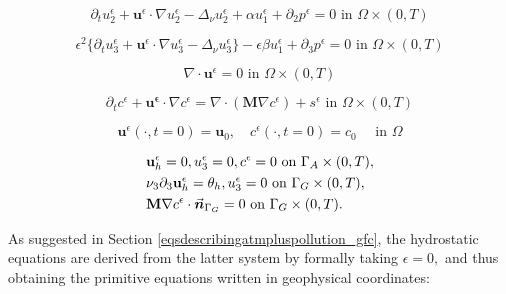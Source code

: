 \documentclass[12pt]{report}
\numberwithin{theorem}{chapter}
\numberwithin{corollary}{chapter}
\numberwithin{lemma}{chapter}
\numberwithin{remark}{chapter}
\numberwithin{definition}{chapter}
\numberwithin{prop}{chapter}
\begin{document}
\begin{equation} \label{ANSC2_coordinates_GFC}
  \partial_t u_2^\epsilon + \mathbf{u}^\epsilon \cdot \nabla u_2^\epsilon -\Delta_\nu u_2^\epsilon + \alpha u_1^\epsilon + \partial_2 p^\epsilon = 0 \text{ in } \Omega \times (0,T)
\end{equation}

\begin{equation} \label{ANSC3_coordinates_GFC}
  \epsilon^2 \{  \partial_t u_3^\epsilon + \mathbf{u}^\epsilon \cdot \nabla u_3^\epsilon -\Delta_\nu u_3^{\epsilon} \} - \epsilon \beta u_1^\epsilon + \partial_3 p^\epsilon = 0 \text{ in } \Omega \times (0,T)
\end{equation}

\begin{equation} \label{ANSC4_coordinates_GFC}
  \nabla \cdot \mathbf{u}^\epsilon= 0 \text{ in } \Omega \times (0,T)
\end{equation}

\begin{equation} \label{ANSC5_coordinates_GFC}
  \partial_t c^\epsilon + \mathbf{u^\epsilon} \cdot \nabla c^\epsilon = \nabla \cdot (\mathbf{M} \nabla c^\epsilon) + s^\epsilon \text{ in } \Omega \times (0,T)
\end{equation}

\begin{equation} \label{ANSC_init_coordinates_GFC}
  \mathbf{u}^\epsilon (\cdot, t = 0) = \mathbf{u}_0, \quad c^\epsilon (\cdot, t=0) = c_0  \quad \text{ in } \Omega
\end{equation}

\begin{equation} \label{ANSC_bc_coordinates_GFC}
  \begin{split}
    & \mathbf{u}^\epsilon_h = 0, u^\epsilon_3 = 0, c^\epsilon = 0 \text{ on } \Gamma_A \times (0,T), \\
    & \nu_3 \partial_3 \mathbf{u}^\epsilon_h = \theta_h, u^\epsilon_3 = 0 \text{ on } \Gamma_G \times (0,T), \\
    & \mathbf{M} \nabla c^\epsilon \cdot \vec{\boldsymbol{n}}_{\Gamma_G} = 0 \text{ on } \Gamma_G \times (0,T).
   \end{split} \raisetag{40pt}
\end{equation}

As suggested in Section \ref{eqsdescribingatmpluspollution_gfc}, the hydrostatic equations are derived from the latter system by formally taking $\epsilon = 0,$ and thus obtaining the primitive equations written in geophysical coordinates:
\end{document}
